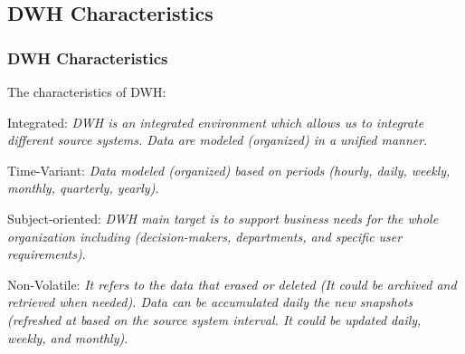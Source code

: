 \subsection{DWH Characteristics}
\begin{frame}
    \frametitle{DWH Characteristics}
    \begin{wideitemize}
        \item The characteristics of DWH:
        \begin{wideitemize}
        	\item Integrated: \textit{DWH is an integrated environment which allows us to
        	integrate different source systems. Data are modeled (organized) in a unified manner}.%
        	
        	\item Time-Variant: \textit{Data modeled (organized) based on periods
        	(hourly, daily, weekly, monthly, quarterly, yearly)}.
        	
        	\item Subject-oriented: \textit{DWH main target is to support business needs for
        	the whole organization including (decision-makers, departments, and
        	specific user requirements)}.
        	
        	\item Non-Volatile: \textit{It refers to the data that erased or deleted (It could be archived and retrieved when needed). Data can be accumulated daily the new snapshots (refreshed at based on the source system interval.  \faArrowCircleORight \space It could be updated daily, weekly, and monthly)}.
        \end{wideitemize}
    \end{wideitemize}
\end{frame}

\VideoClassification[column=2, colour=blue]

